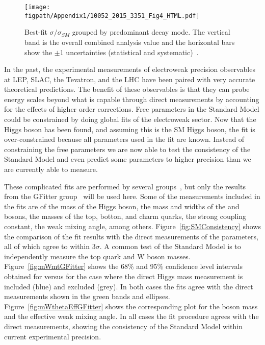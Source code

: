 \begin{figure}[!hbt]
    \centering
    \texttt{[image: \\figpath/Appendix1/10052\_2015\_3351\_Fig4\_HTML.pdf]}
    \caption{Best-fit $\sigma/\sigma_{SM}$ grouped by predominant decay mode. The vertical band is the overall combined analysis value and the horizontal bars show the $\pm$1 uncertainties (statistical and systematic)~\cite{Khachatryan2015}.}
	\label{fig:HiggsSignalStrength}
\end{figure}
In the past, the experimental measurements of electroweak precision observables at LEP, SLAC, the Tevatron, and the LHC have been paired with very accurate theoretical predictions.
The benefit of these observables is that they can probe energy scales beyond what is capable through direct measurements by accounting for the effects of higher order corrections.
Free parameters in the Standard Model could be constrained by doing global fits of the electroweak sector.
Now that the Higgs boson has been found, and assuming this is the SM Higgs boson, the fit is over-constrained because all parameters used in the fit are known.
Instead of constraining the free parameters we are now able to test the consistency of the Standard Model and even predict some parameters to higher precision than we are currently able to measure.

These complicated fits are performed by several groups~\cite{ckmfitter,gfitter,zfitter,lepewwg}, but only the results from the GFitter group~\cite{Baak:2014ora,Flacher:2008zq} will be used here.
Some of the measurements included in the fits are of the mass of the Higgs boson, the mass and widths of the \W and \Z bosons, the masses of the top, botton, and charm quarks, the strong coupling constant, the weak mixing angle, among others.
Figure~\ref{fig:SMConsistency} shows the comparison of the fit results with the direct measurements of the parameters, all of which agree to within $3\sigma$.
A common test of the Standard Model is to independently measure the top quark and W boson masses.
Figure~\ref{fig:mWmtGFitter} shows the 68\% and 95\% confidence level intervals obtained for \MW versus \Mt for the case where the direct Higgs mass measurement is included (blue) and excluded (grey). In both cases the fits agree with the direct measurements shown in the green bands and ellipses.
Figure~\ref{fig:mWthetaEffGFitter} shows the corresponding plot for the \W boson mass and the effective weak mixing angle.
In all cases the fit procedure agrees with the direct measurements, showing the consistency of the Standard Model within current experimental precision.

